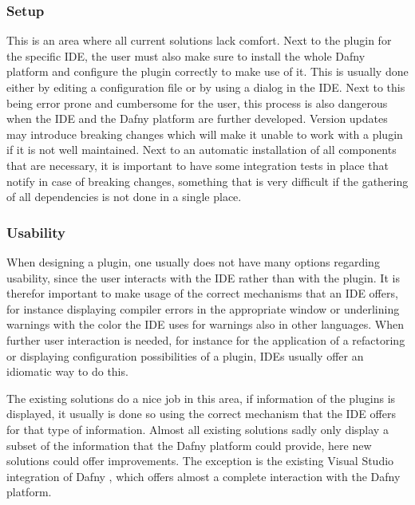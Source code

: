 \subsubsection{Setup}
This is an area where all current solutions lack comfort. Next to the plugin for the specific IDE, the user must also make sure to install the whole Dafny platform and configure the plugin correctly to make use of it. This is usually done either by editing a configuration file or by using a dialog in the IDE. Next to this being error prone and cumbersome for the user, this process is also dangerous when the IDE and the Dafny platform are further developed. Version updates may introduce breaking changes which will make it unable to work with a plugin if it is not well maintained. \newline
Next to an automatic installation of all components that are necessary, it is important to have some integration tests in place that notify in case of breaking changes, something that is very difficult if the gathering of all dependencies is not done in a single place. \newline

\subsubsection{Usability}
When designing a plugin, one usually does not have many options regarding usability, since the user interacts with the IDE rather than with the plugin. It is therefor important to make usage of the correct mechanisms that an IDE offers, for instance displaying compiler errors in the appropriate window or underlining warnings with the color the IDE uses for warnings also in other languages. When further user interaction is needed, for instance for the application of a refactoring or displaying configuration possibilities of a plugin, IDEs usually offer an idiomatic way to do this.  \newline

The existing solutions do a nice job in this area, if information of the plugins is displayed, it usually is done so using the correct mechanism that the IDE offers for that type of information. Almost all existing solutions sadly only display a subset of the information that the Dafny platform could provide, here new solutions could offer improvements. The exception is the existing Visual Studio integration of Dafny \cite{visualstudiodafny}, which offers almost a complete interaction with the Dafny platform. 
\newline

